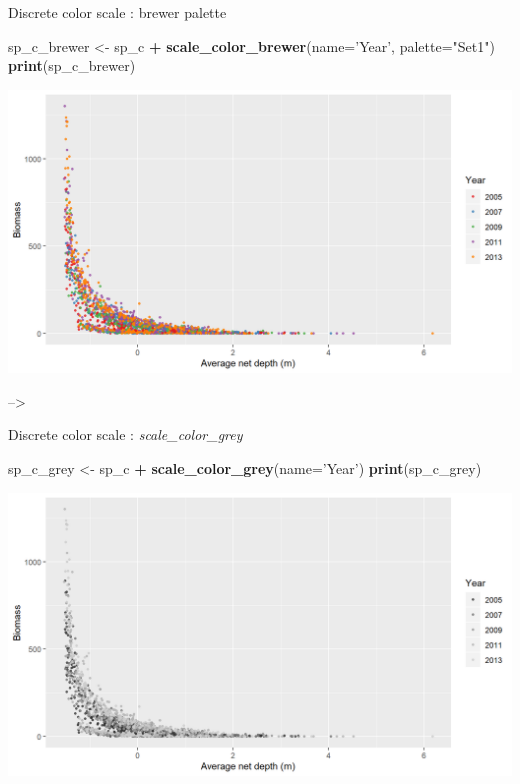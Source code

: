\documentclass[
  ignorenonframetext,
]{beamer}
\newenvironment{Shaded}{\begin{snugshade}}{\end{snugshade}}
\newcommand{\DataTypeTok}[1]{\textcolor[rgb]{0.13,0.29,0.53}{#1}}
\newcommand{\KeywordTok}[1]{\textcolor[rgb]{0.13,0.29,0.53}{\textbf{#1}}}
\newcommand{\NormalTok}[1]{#1}
\newcommand{\OperatorTok}[1]{\textcolor[rgb]{0.81,0.36,0.00}{\textbf{#1}}}
\newcommand{\StringTok}[1]{\textcolor[rgb]{0.31,0.60,0.02}{#1}}
\begin{document}
\begin{frame}[fragile]{Discrete color scale : brewer palette}
\protect\hypertarget{discrete-color-scale-brewer-palette-1}{}

\begin{Shaded}
\begin{Highlighting}[]
\NormalTok{sp_c_brewer <-}\StringTok{ }\NormalTok{sp_c }\OperatorTok{+}
\StringTok{  }\KeywordTok{scale_color_brewer}\NormalTok{(}\DataTypeTok{name=}\StringTok{'Year'}\NormalTok{, }\DataTypeTok{palette=}\StringTok{"Set1"}\NormalTok{)}
\KeywordTok{print}\NormalTok{(sp_c_brewer)}
\end{Highlighting}
\end{Shaded}

\begin{center}\includegraphics[width=0.8\linewidth]{figure/sp_discrete_color4b-1} \end{center}

--\textgreater{}

\end{frame}

\begin{frame}[fragile]{Discrete color scale : \emph{scale\_color\_grey}}
\protect\hypertarget{discrete-color-scale-scale_color_grey}{}

\begin{Shaded}
\begin{Highlighting}[]
\NormalTok{sp_c_grey <-}\StringTok{ }\NormalTok{sp_c }\OperatorTok{+}
\StringTok{  }\KeywordTok{scale_color_grey}\NormalTok{(}\DataTypeTok{name=}\StringTok{'Year'}\NormalTok{)}
\KeywordTok{print}\NormalTok{(sp_c_grey)}
\end{Highlighting}
\end{Shaded}

\begin{center}\includegraphics[width=0.8\linewidth]{figure/sp_discrete_color5-1} \end{center}

\end{frame}
\end{document}
